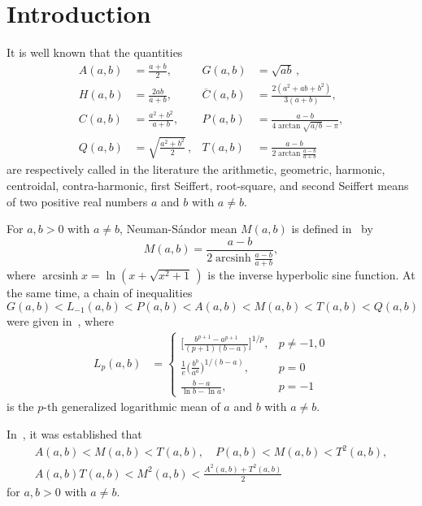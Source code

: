 \documentclass[reqno,a4paper]{amsart}
\numberwithin{equation}{section}
\theoremstyle{plain}
\theoremstyle{remark}
\begin{document}
\section{Introduction}
It is well known that the quantities
\begin{align*}
A(a,b)&=\frac{a+b}2,&G(a,b)&=\sqrt{ab}\,,\\
H(a,b)&=\frac{2ab}{a+b},&\overline{C}(a,b)&=\frac{2(a^2+ab+b^2)}{3(a+b)},\\
C(a,b)&=\frac{a^2+b^2}{a+b},&P(a,b)&=\frac{a-b}{4\arctan\sqrt{a/b}\,-\pi},\\
Q(a,b)&=\sqrt{\frac{a^2+b^2}{2}}\,,&T(a,b)&=\frac{a-b}{2\arctan\frac{a-b}{a+b}}
\end{align*}
are respectively called in the literature the arithmetic, geometric, harmonic, centroidal,
contra-harmonic, first Seiffert, root-square, and second Seiffert means of two positive real
numbers $a$ and $b$ with $a\ne b$.
\par
For $a,b>0$ with $a\ne b$, Neuman-S\'andor mean $M(a,b)$ is defined in~\cite{Neuman-M-Def} by
\begin{equation*}
M(a,b)=\frac{a-b}{2\operatorname{arcsinh}\frac{a-b}{a+b}},
\end{equation*}
where $\operatorname{arcsinh} x=\ln(x+\sqrt{x^2+1}\,)$ is the inverse hyperbolic sine function. At the same time, a chain of inequalities
\begin{equation*}
G(a,b)<L_{-1}(a,b)<P(a,b)<A(a,b)<M(a,b)<T(a,b)<Q(a,b)
\end{equation*}
were given in~\cite{Neuman-M-Def}, where
\begin{align*}
L_p(a,b)&=
\begin{cases}\displaystyle
\biggl[\frac{b^{p+1}-a^{p+1}}{(p+1)(b-a)}\biggr]^{1/p}, & p\ne-1,0 \\ \displaystyle
\frac1e\biggl(\frac{b^b}{a^a}\biggr)^{1/(b-a)}, & p=0\\ \displaystyle
\frac{b-a}{\ln b-\ln a},& p=-1
\end{cases}
\end{align*}
is the $p$-th generalized logarithmic mean of $a$ and $b$ with $a\ne b$.
\par
In~\cite{Neuman-M-Def, Neuman-M-Def-2}, it was established that
\begin{gather*}
A(a,b)<M(a,b)<T(a,b),\quad
P(a,b)<M(a,b)<T^2(a,b),\\
A(a,b)T(a,b)<M^2(a,b)<\frac{A^2(a,b)+T^2(a,b)}2
\end{gather*}
for $a,b>0$ with $a\ne b$.\par
\end{document}
